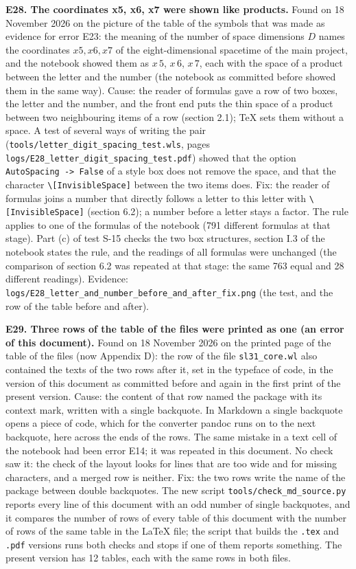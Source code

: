 \documentclass[
  10pt,
]{article}
\begin{document}
\textbf{E28. The coordinates x5, x6, x7 were shown like products.} Found
on 18 November 2026 on the picture of the table of the symbols that was
made as evidence for error E23: the meaning of the number of space
dimensions \(D\) names the coordinates \(x5,x6,x7\) of the
eight-dimensional spacetime of the main project, and the notebook showed
them as \(x\,5\), \(x\,6\), \(x\,7\), each with the space of a product
between the letter and the number (the notebook as committed before
showed them in the same way). Cause: the reader of formulas gave a row
of two boxes, the letter and the number, and the front end puts the thin
space of a product between two neighbouring items of a row (section
2.1); TeX sets them without a space. A test of several ways of writing
the pair (\texttt{tools/letter\_digit\_spacing\_test.wls}, pages
\texttt{logs/E28\_letter\_digit\_spacing\_test.pdf}) showed that the
option \texttt{AutoSpacing\ -\textgreater{}\ False} of a style box does
not remove the space, and that the character
\texttt{\textbackslash{}{[}InvisibleSpace{]}} between the two items
does. Fix: the reader of formulas joins a number that directly follows a
letter to this letter with \texttt{\textbackslash{}{[}InvisibleSpace{]}}
(section 6.2); a number before a letter stays a factor. The rule applies
to one of the formulas of the notebook (791 different formulas at that
stage). Part (c) of test S-15 checks the two box structures, section I.3
of the notebook states the rule, and the readings of all formulas were
unchanged (the comparison of section 6.2 was repeated at that stage: the
same 763 equal and 28 different readings). Evidence:
\texttt{logs/E28\_letter\_and\_number\_before\_and\_after\_fix.png} (the
test, and the row of the table before and after).

\textbf{E29. Three rows of the table of the files were printed as one
(an error of this document).} Found on 18 November 2026 on the printed
page of the table of the files (now Appendix D): the row of the file
\texttt{sl31\_core.wl} also contained the texts of the two rows after
it, set in the typeface of code, in the version of this document as
committed before and again in the first print of the present version.
Cause: the content of that row named the package with its context mark,
written with a single backquote. In Markdown a single backquote opens a
piece of code, which for the converter pandoc runs on to the next
backquote, here across the ends of the rows. The same mistake in a text
cell of the notebook had been error E14; it was repeated in this
document. No check saw it: the check of the layout looks for lines that
are too wide and for missing characters, and a merged row is neither.
Fix: the two rows write the name of the package between double
backquotes. The new script \texttt{tools/check\_md\_source.py} reports
every line of this document with an odd number of single backquotes, and
it compares the number of rows of every table of this document with the
number of rows of the same table in the LaTeX file; the script that
builds the \texttt{.tex} and \texttt{.pdf} versions runs both checks and
stops if one of them reports something. The present version has 12
tables, each with the same rows in both files.
\end{document}
